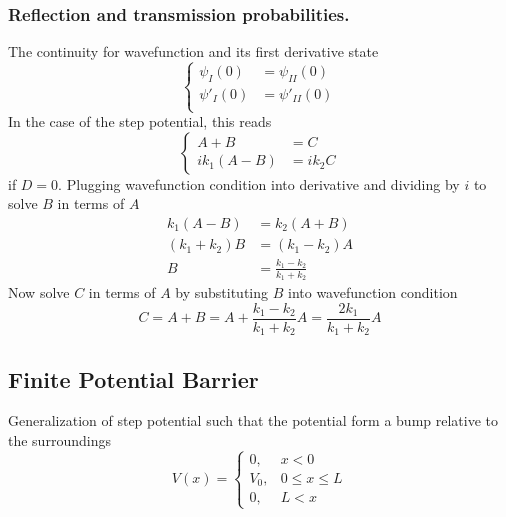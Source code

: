 \documentclass[../../../main.tex]{subfiles}
\begin{document}
\subsubsection{Reflection and transmission probabilities.}
The continuity for wavefunction and its first derivative state
\begin{equation*}
    \begin{cases}
        \psi_I(0)  & =\psi_{II}(0)  \\
        \psi'_I(0) & =\psi'_{II}(0) \\
    \end{cases}
\end{equation*}
In the case of the step potential, this reads
\begin{equation*}
    \begin{cases}
        A+B       & =C       \\
        ik_1(A-B) & =  ik_2C
    \end{cases}
\end{equation*}
if $D=0$.
Plugging wavefunction condition into derivative and dividing by $i$ to solve $B$ in  terms of $A$
\begin{align*}
    k_1(A-B)      & =  k_2(A+B)                 \\
    (k_1 + k_2) B & =  (k_1 - k_2) A            \\
    B             & =  \frac{k_1-k_2 }{k_1+k_2}
\end{align*}
Now solve $C$ in terms of $A$ by substituting $B$ into wavefunction condition
\begin{equation*}
    C = A + B = A + \frac{k_1 - k_2}{k_1 + k_2} A = \frac{2 k_1}{k_1 + k_2} A
\end{equation*}

\subsection{Finite Potential Barrier}
Generalization of step potential such that the potential form a bump relative to the surroundings
\begin{equation*}
    V(x) =
    \begin{cases}
        0,   & x < 0         \\
        V_0, & 0 \le x \le L \\
        0,   & L < x
    \end{cases}
\end{equation*}
\end{document}
